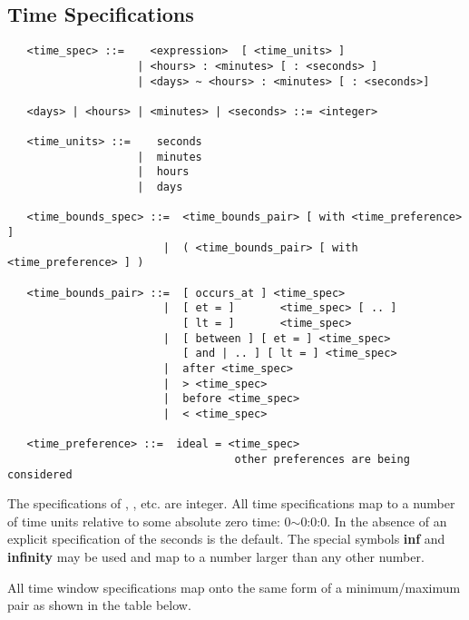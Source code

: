 \subsection{Time Specifications}

\begin{verbatim}
   <time_spec> ::=    <expression>  [ <time_units> ]
                    | <hours> : <minutes> [ : <seconds> ]
                    | <days> ~ <hours> : <minutes> [ : <seconds>]

   <days> | <hours> | <minutes> | <seconds> ::= <integer>

   <time_units> ::=    seconds
                    |  minutes
                    |  hours
                    |  days

   <time_bounds_spec> ::=  <time_bounds_pair> [ with <time_preference> ]
                        |  ( <time_bounds_pair> [ with <time_preference> ] )

   <time_bounds_pair> ::=  [ occurs_at ] <time_spec>
                        |  [ et = ]       <time_spec> [ .. ]
                           [ lt = ]       <time_spec>
                        |  [ between ] [ et = ] <time_spec>
                           [ and | .. ] [ lt = ] <time_spec>
                        |  after <time_spec>
                        |  > <time_spec>
                        |  before <time_spec>
                        |  < <time_spec>

   <time_preference> ::=  ideal = <time_spec>
                                   other preferences are being considered
\end{verbatim}

The specifications of , , etc.  are integer.  All time
specifications map to a number of time units relative to some absolute zero
time: 0$\sim$0:0:0.  In the absence of an explicit specification of the
 seconds is the default.  The special symbols {\bf inf} and
{\bf infinity} may be used and map to a number larger than any other number.

All time window specifications map onto the same form of a minimum/maximum
pair as shown in the table below.

